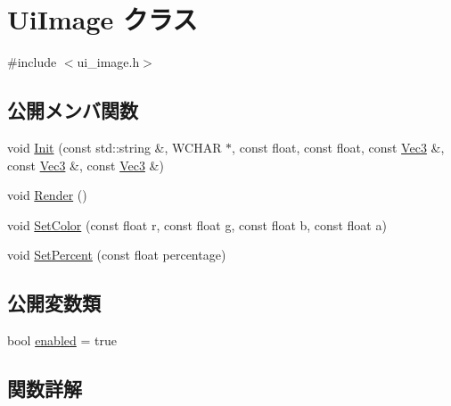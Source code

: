 \hypertarget{class_ui_image}{}\section{Ui\+Image クラス}
\label{class_ui_image}


{\ttfamily \#include $<$ui\+\_\+image.\+h$>$}

\subsection*{公開メンバ関数}
\begin{DoxyCompactItemize}
\item 
void \mbox{\hyperlink{class_ui_image_aff0cc57cb4cf6a9edfb1fc9ce1bb8ab0}{Init}} (const std\+::string \&, W\+C\+H\+AR $\ast$, const float, const float, const \mbox{\hyperlink{common_8h_ab1cb35b3a17c398d8ef71d5f779808bf}{Vec3}} \&, const \mbox{\hyperlink{common_8h_ab1cb35b3a17c398d8ef71d5f779808bf}{Vec3}} \&, const \mbox{\hyperlink{common_8h_ab1cb35b3a17c398d8ef71d5f779808bf}{Vec3}} \&)
\item 
void \mbox{\hyperlink{class_ui_image_a2f0a08734b368e32b8cbd9f7682e0413}{Render}} ()
\item 
void \mbox{\hyperlink{class_ui_image_a2fa9658d867a9f50da24f655ae92396c}{Set\+Color}} (const float r, const float g, const float b, const float a)
\item 
void \mbox{\hyperlink{class_ui_image_a3c006a6e60e8af7c43d2548b78746e85}{Set\+Percent}} (const float percentage)
\end{DoxyCompactItemize}
\subsection*{公開変数類}
\begin{DoxyCompactItemize}
\item 
bool \mbox{\hyperlink{class_ui_image_a34d64237c00b41c32122d996c2f35f3a}{enabled}} = true
\end{DoxyCompactItemize}


\subsection{関数詳解}
\mbox{\label{class_ui_image_aff0cc57cb4cf6a9edfb1fc9ce1bb8ab0}} 
